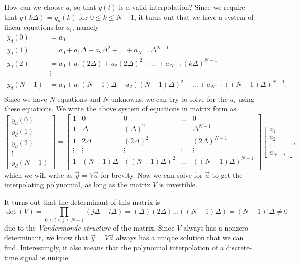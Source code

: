 How can we choose $a_i$ so that $y(t)$ is a valid interpolation? Since we require that $y(k\Delta)=y_d(k)$ for $0\le k \le N-1$, it turns out that we have a system of linear equations for $a_i$, namely
\begin{align*}
y_d(0) &= a_0\\
y_d(1) &= a_0 + a_1 \Delta + a_2 \Delta^2 + \dotso + a_{N-1} \Delta^{N-1}\\
y_d(2) &= a_0 + a_1 (2\Delta) + a_2 (2\Delta)^2 + \dotso + a_{N-1} (k\Delta)^{N-1}\\
&\vdots\\
y_d(N-1) &= a_0 + a_1 (N-1)\Delta + a_2 ((N-1)\Delta)^2 + \dotso + a_{N-1} ((N-1)\Delta)^{N-1}.\\
\end{align*}
Since we have $N$ equations and $N$ unknowns, we can try to solve for the $a_i$ using these equations. We write the above system of equations in matrix form as
\begin{equation*}
\begin{bmatrix}
y_d(0) \\ y_d(1) \\ y_d(2) \\ \vdots \\ y_d(N-1)
\end{bmatrix}=
\begin{bmatrix}
1 & 0 & 0 & \hdots & 0\\
1 & \Delta & (\Delta)^2 & \hdots & \Delta^{N-1}\\
1 & 2\Delta & (2\Delta)^2 & \hdots & (2\Delta)^{N-1}\\
\vdots & \vdots & \vdots & \vdots & \vdots\\
1 & (N-1)\Delta & ((N-1)\Delta)^2 & \hdots & ((N-1)\Delta)^{N-1}\\
\end{bmatrix}
\begin{bmatrix}
a_1 \\ a_2 \\ \vdots \\ a_{N-1}
\end{bmatrix},
\end{equation*}
which we will write as $\vec{y} = V \vec{a}$ for brevity. Now we can solve for $\vec a$ to get the interpolating polynomial, as long as the matrix $V$ is invertible.

It turns out that the determinant of this matrix is
\begin{equation*}
 \det(V) = \prod_{0\le i \le j \le N-1} (j\Delta-i\Delta) = (\Delta)(2\Delta)\dotso((N-1)\Delta)
 =(N-1)!\Delta \ne 0
\end{equation*}
due to the \emph{Vandermonde structure} of the matrix.
Since $V$ always has a nonzero determinant, we know that $\vec{y}=V\vec{a}$ always has a unique solution that we can find. Interestingly, it also means that the polynomial interpolation of a discrete-time signal is unique.
